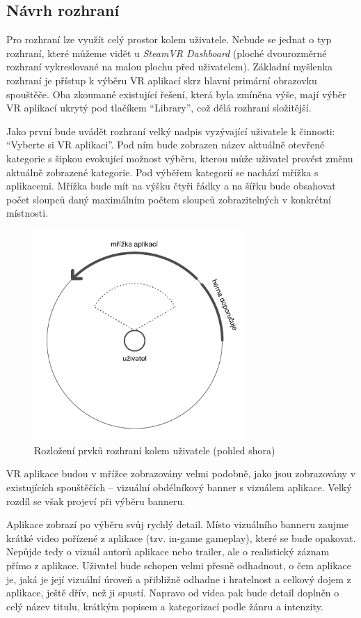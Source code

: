 \subsection{Návrh rozhraní}\label{nuxe1vrh-rozhranuxed}

Pro rozhraní lze využít celý prostor kolem uživatele. Nebude se jednat o
typ rozhraní, které můžeme vidět u \emph{SteamVR Dashboard} (ploché
dvourozměrné rozhraní vykreslované na malou plochu před uživatelem).
Základní myšlenka rozhraní je přístup k výběru VR aplikací skrz hlavní
primární obrazovku spouštěče. Oba zkoumané existující řešení, která byla
zmíněna výše, mají výběr VR aplikací ukrytý pod tlačíkem ``Library'',
což dělá rozhraní složitější.

Jako první bude uvádět rozhraní velký nadpis vyzývající uživatele k
činnosti: ``Vyberte si VR aplikaci''. Pod ním bude zobrazen název
aktuálně otevřené kategorie s šipkou evokující možnost výběru, kterou
může uživatel provést změnu aktuálně zobrazené kategorie. Pod výběřem
kategorií se nachází mřížka s aplikacemi. Mřížka bude mít na výšku čtyři
řádky a na šířku bude obsahovat počet sloupců daný maximálním
počtem sloupců zobrazitelných v konkrétní místnosti.

\begin{figure}[h!]
\centering
\includegraphics[height=8cm]{src/assets/wireframe-topdown-arrangement.pdf}
\caption{Rozložení prvků rozhraní kolem uživatele (pohled shora)}
\end{figure}

VR aplikace budou v mřížce zobrazovány velmi podobně, jako jsou
zobrazovány v existujících spouštěčích -- vizuální obdélníkový banner s
vizuálem aplikace. Velký rozdíl se však projeví při výběru banneru.

Aplikace zobrazí po výběru svůj rychlý detail. Místo vizuálního banneru zaujme
krátké video pořízené z aplikace (tzv. in-game gameplay), které se bude
opakovat. Nepůjde tedy o vizuál autorů aplikace nebo trailer, ale o
realistický záznam přímo z aplikace. Uživatel bude schopen velmi přesně
odhadnout, o čem aplikace je, jaká je její vizuální úroveň a přibližně
odhadne i hratelnost a celkový dojem z aplikace, ještě dřív, než ji
spustí. Napravo od videa pak bude detail doplněn o celý název titulu,
krátkým popisem a kategorizací podle žánru a intenzity. 

